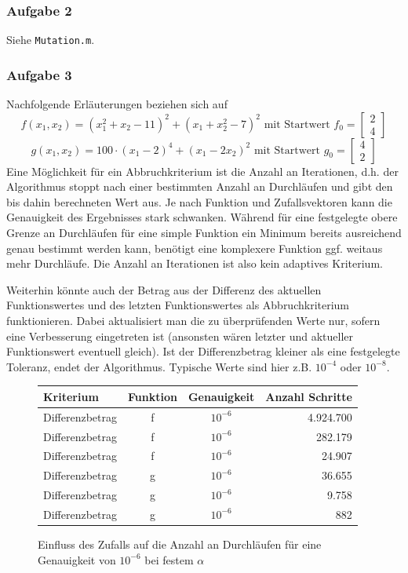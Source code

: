 \documentclass[a4paper, 12pt]{report}
\begin{document}
\subsubsection{Aufgabe 2}
Siehe \lstinline[basicstyle=\ttfamily\color{black}]|Mutation.m|.

\subsubsection{Aufgabe 3}
Nachfolgende Erläuterungen beziehen sich auf 
$$f(x_1, x_2) = (x_1^2 + x_2 - 11)^2 + (x_1 + x_2^2 - 7)^2 \text{ mit Startwert } f_0=\begin{bmatrix}2\\4\end{bmatrix}$$
$$g(x_1, x_2) = 100\cdot (x_1 - 2)^4 + (x_1 - 2x_2)^2 \text{ mit Startwert } g_0=\begin{bmatrix}4\\2\end{bmatrix}$$
Eine Möglichkeit für ein Abbruchkriterium ist die Anzahl an Iterationen, d.h. der Algorithmus stoppt nach einer bestimmten Anzahl an Durchläufen
und gibt den bis dahin berechneten Wert aus. Je nach Funktion und Zufallsvektoren kann die Genauigkeit des Ergebnisses stark schwanken. Während für
eine festgelegte obere Grenze an Durchläufen für eine simple Funktion ein Minimum bereits ausreichend genau bestimmt werden kann, benötigt eine
komplexere Funktion ggf. weitaus mehr Durchläufe. Die Anzahl an Iterationen ist also kein adaptives Kriterium.\par
Weiterhin könnte auch der Betrag aus der Differenz des aktuellen Funktionswertes und des letzten Funktionswertes als Abbruchkriterium funktionieren.
Dabei aktualisiert man die zu überprüfenden Werte nur, sofern eine Verbesserung eingetreten ist (ansonsten wären letzter und aktueller Funktionswert
eventuell gleich). Ist der Differenzbetrag kleiner als eine festgelegte Toleranz, endet der Algorithmus. Typische Werte sind hier z.B. $10^{-4}$ oder
$10^{-8}$.\\\par

\begin{figure}[H]
  \centering
  \def\arraystretch{1.25}
  \begin{tabular}{l|c|c|r}
    \hline
    \textbf{Kriterium} & \textbf{Funktion} & \textbf{Genauigkeit} & \textbf{Anzahl Schritte}\\
    \hline
    Differenzbetrag & f & $10^{-6}$ & 4.924.700\\
    Differenzbetrag & f & $10^{-6}$ & 282.179\\
    Differenzbetrag & f & $10^{-6}$ & 24.907\\
    Differenzbetrag & g & $10^{-6}$ & 36.655\\
    Differenzbetrag & g & $10^{-6}$ & 9.758\\
    Differenzbetrag & g & $10^{-6}$ & 882\\
    \hline
  \end{tabular}
  \caption{Einfluss des Zufalls auf die Anzahl an Durchläufen für eine Genauigkeit von $10^{-6}$ bei festem $\alpha$}
  \label{fig:mutSelTbl}
\end{figure}
\end{document}
